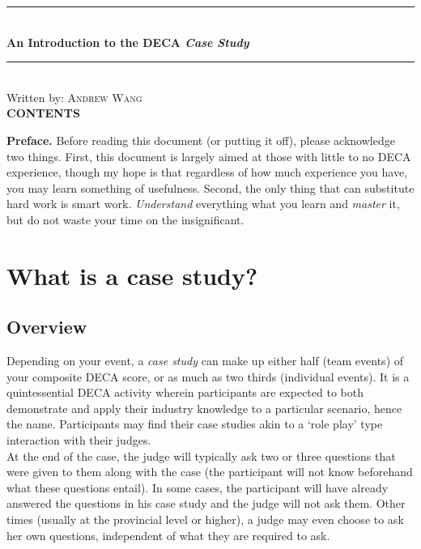 \documentclass[12pt]{article}
\makeatletter
\newcommand*{\toccontents}{\@starttoc{toc}}
\makeatother
\begin{document}
\thispagestyle{empty}


	\newcommand{\HRule}{\rule{\linewidth}{0.5mm}} 
	\begin{center}

	\HRule\\[0.4cm]
	
	{\huge\bfseries An Introduction to the DECA \textit{Case Study}}\\[0.4cm] 
	
	\HRule\\[0.4cm]
	{Written by: \textsc{Andrew Wang}} \\[1cm]
	{\large\bfseries \textsc{CONTENTS}}\\[0.4cm] 
	\vspace*{.5\baselineskip}
	\toccontents
	\end{center}
	
\vspace*{3\baselineskip}

\textbf{Preface.} Before reading this document (or putting it off), please acknowledge two things. First, this document is largely aimed at those with little to no DECA experience, though my hope is that regardless of how much experience you have, you may learn something of usefulness. Second, the only thing that can substitute hard work is smart work. \textit{Understand} everything what you learn and \textit{master} it, but do not waste your time on the insignificant.

\section{What is a case study?}

\subsection{Overview}

	Depending on your event, a \textit{case study} can make up either half (team events) of your composite DECA score, or as much as two thirds (individual events). It is a quintessential DECA activity wherein participants are expected to both demonstrate and apply their industry knowledge to a particular scenario, hence the name. Participants may find their case studies akin to a \lq role play' type interaction with their judges. \\ 
	
	 At the end of the case, the judge will typically ask two or three questions that were given to them along with the case (the participant will not know beforehand what these questions entail). In some cases, the participant will have already answered the questions in his case study and the judge will not ask them. Other times (usually at the provincial level or higher), a judge may even choose to ask her own questions, independent of what they are required to ask. \\
	
\end{document}
